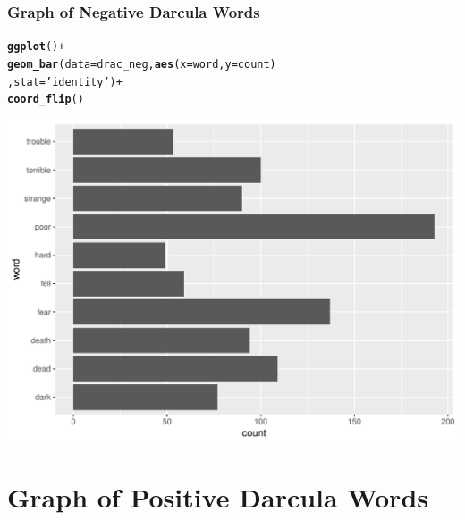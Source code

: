 \documentclass{beamer}\usepackage[]{graphicx}\usepackage[]{color}
\makeatletter
\def\maxwidth{ %
  \ifdim\Gin@nat@width>\linewidth
    \linewidth
  \else
    \Gin@nat@width
  \fi
}
\newcommand{\hlstr}[1]{\textcolor[rgb]{0.192,0.494,0.8}{#1}}%
\newcommand{\hlopt}[1]{\textcolor[rgb]{0,0,0}{#1}}%
\newcommand{\hlstd}[1]{\textcolor[rgb]{0.345,0.345,0.345}{#1}}%
\newcommand{\hlkwc}[1]{\textcolor[rgb]{0.333,0.667,0.333}{#1}}%
\newcommand{\hlkwd}[1]{\textcolor[rgb]{0.737,0.353,0.396}{\textbf{#1}}}%
\newenvironment{kframe}{%
 \def\at@end@of@kframe{}%
 \ifinner\ifhmode%
  \def\at@end@of@kframe{\end{minipage}}%
  \begin{minipage}{\columnwidth}%
 \fi\fi%
 \def\FrameCommand##1{\hskip\@totalleftmargin \hskip-\fboxsep
 \colorbox{shadecolor}{##1}\hskip-\fboxsep
     \hskip-\linewidth \hskip-\@totalleftmargin \hskip\columnwidth}%
 \MakeFramed {\advance\hsize-\width
   \@totalleftmargin\z@ \linewidth\hsize
   \@setminipage}}%
 {\par\unskip\endMakeFramed%
 \at@end@of@kframe}
\newenvironment{knitrout}{}{} %
\makeatother
\begin{document}
\begin{frame}

  \frametitle{Graph of Negative Darcula Words}
\begin{knitrout}
\color{fgcolor}\begin{kframe}
\begin{alltt}
\hlkwd{ggplot}\hlstd{()}\hlopt{+}
  \hlkwd{geom_bar}\hlstd{(}\hlkwc{data} \hlstd{= drac_neg,}\hlkwd{aes}\hlstd{(}\hlkwc{x}\hlstd{=word,}\hlkwc{y}\hlstd{=count)}
           \hlstd{,}\hlkwc{stat}\hlstd{=}\hlstr{'identity'}\hlstd{)}\hlopt{+}
  \hlkwd{coord_flip}\hlstd{()}
\end{alltt}
\end{kframe}
\includegraphics[width=\maxwidth]{figure/unnamed-chunk-13-1} 

\end{knitrout}
  
\end{frame}


\section{Graph of Positive Darcula Words}
\end{document}
